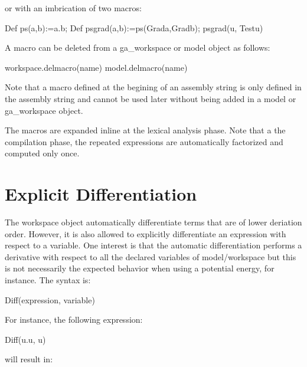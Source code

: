 \documentclass[a4paper,11pt,english]{sphinxmanual}
\begin{document}
or with an imbrication of two macros:

\begin{sphinxVerbatim}[commandchars=\\\{\}]
\PYGZdq{}Def ps(a,b):=a.b; Def psgrad(a,b):=ps(Grad\PYGZus{}a,Grad\PYGZus{}b); psgrad(u, Test\PYGZus{}u)\PYGZdq{}
\end{sphinxVerbatim}

A macro can be deleted from a ga\_workspace or model object as follows:

\begin{sphinxVerbatim}[commandchars=\\\{\}]
workspace.del\PYGZus{}macro(name)
model.del\PYGZus{}macro(name)
\end{sphinxVerbatim}

Note that a macro defined at the begining of an assembly string is only defined in the assembly string and cannot be used later without being added in a model or ga\_workspace object.

The macros are expanded inline at the lexical analysis phase. Note that a the compilation phase, the repeated expressions are automatically factorized and computed only once.


\section{Explicit Differentiation}
\label{\detokenize{userdoc/gasm_high:explicit-differentiation}}
The workspace object automatically differentiate terms that are of lower deriation order. However, it is also allowed to explicitly differentiate an expression with respect to a variable. One interest is that the automatic differentiation performs a derivative with respect to all the declared variables of model/workspace but this is not necessarily the expected behavior when using a potential energy, for instance. The syntax is:

\begin{sphinxVerbatim}[commandchars=\\\{\}]
Diff(expression, variable)
\end{sphinxVerbatim}

For instance, the following expression:

\begin{sphinxVerbatim}[commandchars=\\\{\}]
Diff(u.u, u)
\end{sphinxVerbatim}

will result in:
\end{document}
